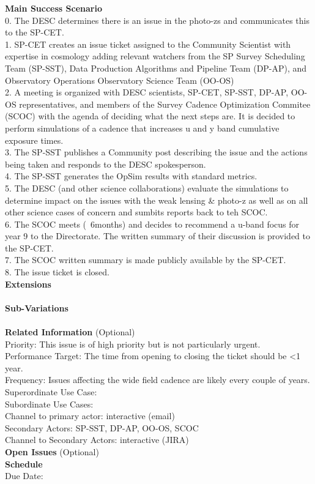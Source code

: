 {\bf Main Success Scenario} \\
0. The DESC determines there is an issue in the photo-zs and communicates this to the SP-CET. \\
1. SP-CET creates an issue ticket assigned to the Community Scientist with expertise in cosmology adding relevant watchers from the SP Survey Scheduling Team (SP-SST), Data Production Algorithms and Pipeline Team (DP-AP), and Observatory Operations Observatory Science Team (OO-OS) \\
2. A meeting is organized with DESC scientists, SP-CET, SP-SST, DP-AP, OO-OS representatives, and members of the Survey Cadence Optimization Commitee (SCOC) with the agenda of deciding what the next steps are. It is decided to perform simulations of a cadence that increases u and y band cumulative exposure times. \\
3. The SP-SST publishes a Community post describing the issue and the actions being taken and responds to the DESC spokesperson. \\
4. The SP-SST generates the OpSim results with standard metrics. \\ 
5. The DESC (and other science collaborations) evaluate the simulations to determine impact on the issues with the weak lensing & photo-z as well as on all other science cases of concern and sumbits reports back to teh SCOC. \\
6. The SCOC meets (~6months) and decides to recommend a u-band focus for year 9 to the Directorate. The written summary of their discussion is provided to the SP-CET. \\
7. The SCOC written summary is made publicly available by the SP-CET. \\
8. The issue ticket is closed. \\


{\bf Extensions} \\
\\

{\bf Sub-Variations} \\
\\

{\bf Related Information} (Optional) \\
Priority: This issue is of high priority but is not particularly urgent. \\
Performance Target: The time from opening to closing the ticket should be <1 year. \\
Frequency: Issues affecting the wide field cadence are likely every couple of years. \\
Superordinate Use Case:  \\
Subordinate Use Cases: \\
Channel to primary actor: interactive (email) \\
Secondary Actors: SP-SST, DP-AP, OO-OS, SCOC \\
Channel to Secondary Actors: interactive (JIRA) \\

{\bf Open Issues} (Optional) \\

{\bf Schedule} \\
Due Date: \\
